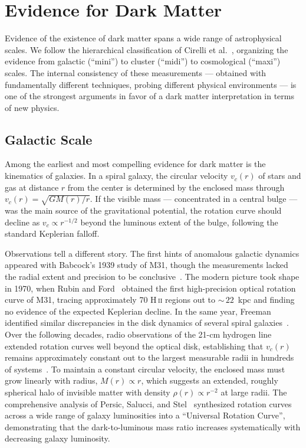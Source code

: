 
\section{Evidence for Dark Matter}
\label{sec:1.1}
Evidence of the existence of dark matter spans a wide range of astrophysical scales.
We follow the hierarchical classification of Cirelli et al.~\cite{Cirelli:2024ssz}, organizing the evidence from galactic (``mini'') to cluster (``midi'') to cosmological (``maxi'') scales.
The internal consistency of these measurements --- obtained with fundamentally different techniques, probing different physical environments --- is one of the strongest arguments in favor of a dark matter interpretation in terms of new physics. 

\subsection{Galactic Scale}
\label{sec:1.1.1}

Among the earliest and most compelling evidence for dark matter is the kinematics of galaxies.
In a spiral galaxy, the circular velocity $v_c(r)$ of stars and gas at distance $r$ from the center is determined by the enclosed mass through $v_c(r) = \sqrt{GM(r)/r}$.
If the visible mass --- concentrated in a central bulge --- was the main source of the gravitational potential, the rotation curve should decline as $v_c \propto r^{-1/2}$ beyond the luminous extent of the bulge, following the standard Keplerian falloff.

Observations tell a different story.
The first hints of anomalous galactic dynamics appeared with Babcock's 1939 study of M31, though the measurements lacked the radial extent and precision to be conclusive~\cite{Babcock:1939}.
The modern picture took shape in 1970, when Rubin and Ford~\cite{Rubin:1970zza} obtained the first high-precision optical rotation curve of M31, tracing approximately 70 H\,\textsc{ii} regions out to ${\sim}\,22$~kpc and finding no evidence of the expected Keplerian decline.
In the same year, Freeman identified similar discrepancies in the disk dynamics of several spiral galaxies~\cite{Freeman:1970}.
Over the following decades, radio observations of the 21-cm hydrogen line extended rotation curves well beyond the optical disk, establishing that $v_c(r)$ remains approximately constant out to the largest measurable radii in hundreds of systems~\cite{Rubin:1980zd,Bosma:1981zz}.
To maintain a constant circular velocity, the enclosed mass must grow linearly with radius, $M(r) \propto r$, which suggests an extended, roughly spherical halo of invisible matter with density $\rho(r) \propto r^{-2}$ at large radii.
The comprehensive analysis of Persic, Salucci, and Stel~\cite{Persic:1995ru} synthesized rotation curves across a wide range of galaxy luminosities into a ``Universal Rotation Curve'', demonstrating that the dark-to-luminous mass ratio increases systematically with decreasing galaxy luminosity.

